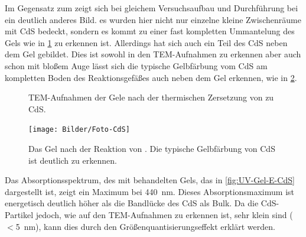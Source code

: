 		Im Gegensatz zum  zeigt sich bei gleichem Versuchsaufbau und Durchführung bei  ein deutlich anderes Bild.
		es wurden hier nicht nur einzelne  kleine Zwischenräume mit CdS bedeckt, sondern es kommt zu einer fast kompletten Ummantelung des Gels wie in \cref{fig:Gel-E-CdS} zu erkennen ist.
		Allerdings hat sich auch ein Teil des CdS neben dem Gel gebildet. 
		Dies ist sowohl in den TEM-Aufnahmen zu erkennen aber auch schon mit bloßem Auge lässt sich die typische Gelbfärbung vom CdS am kompletten Boden des Reaktionsgefäßes auch neben dem Gel erkennen, wie in \cref{fig:Foto-CdS}.
		\begin{figure}[htbp]
			\centering
			\caption{TEM-Aufnahmen der Gele nach der thermischen Zersetzung von  zu CdS.}
			\label{fig:Gel-E-CdS}
		\end{figure}
	
		\begin{figure}[H]
			\centering
			\texttt{[image: Bilder/Foto-CdS]} 	
			\caption{Das Gel nach der Reaktion von . Die typische Gelbfärbung von CdS ist deutlich zu erkennen.}
			\label{fig:Foto-CdS}
		\end{figure}
		
		Das Absorptionsspektrum, des mit  behandelten Gels, das in \cref{fig:UV-Gel-E-CdS} dargestellt ist, zeigt ein Maximum bei \SI{440}{\nano\meter}. 
		Dieses Absorptionsmaximum ist energetisch deutlich  höher als die Bandlücke des CdS als Bulk. 
		Da die CdS-Partikel jedoch, wie auf den TEM-Aufnahmen zu erkennen ist, sehr klein sind ($<$\SI{5}{\nano\meter}), kann dies durch den Größenquantisierungseffekt erklärt werden.
		
